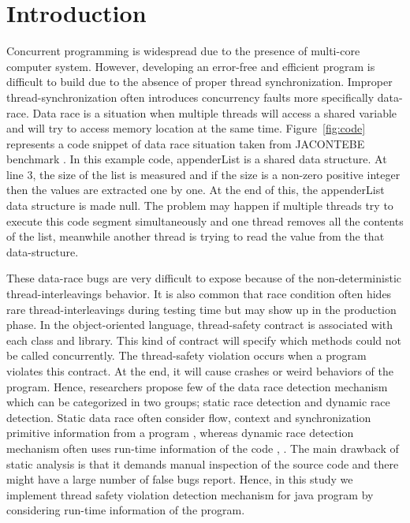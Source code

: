 \section{Introduction}
\label{sec:intro}

Concurrent programming is widespread due to the presence of multi-core computer
system. However, developing an error-free and efficient program is difficult to
build due to the absence of proper thread synchronization. Improper
thread-synchronization often introduces concurrency faults more specifically
data-race. Data race is a situation when multiple threads will access a shared
variable and will try to access memory location at the same time.
Figure~\ref{fig:code} represents a code snippet of data race situation taken
from JACONTEBE benchmark \cite{}. In this example code, appenderList is a
shared data structure. At line 3, the size of the list is measured and if the
size is a non-zero positive integer then the values are extracted one by one.
At the end of this, the appenderList data structure is made null. The problem
may happen if multiple threads try to execute this code segment simultaneously
and one thread removes all the contents of the list, meanwhile another thread
is trying to read the value from the that data-structure.    

These data-race bugs are very difficult to expose because of the
non-deterministic thread-interleavings behavior. It is also common that race
condition often hides rare thread-interleavings during testing time but may
show up in the production phase. In the object-oriented language, thread-safety
contract is associated with each class and library. This kind of contract will
specify which methods could not be called concurrently. The thread-safety
violation occurs when a program violates this contract. At the end, it will
cause crashes or weird behaviors of the program.  Hence, researchers propose
few of the data race detection mechanism which can be categorized in two
groups; static race detection and dynamic race detection. Static data race
often consider flow, context and synchronization primitive information from a
program \cite{kahlon2009ESEC}, \cite{naik2006PLDI} whereas dynamic race
detection mechanism often uses run-time information of the code
\cite{pozniansky2007multirace}, \cite{li2019efficient}.   The main drawback of
static analysis is that it demands manual inspection of the source code and
there might have a large number of false bugs report. Hence, in this study we
implement thread safety violation detection mechanism for java program by
considering run-time information of the program. 

